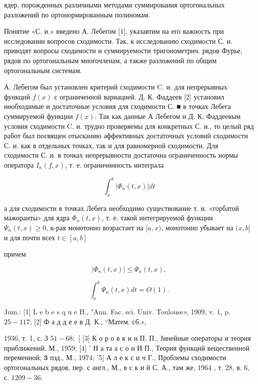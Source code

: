 \documentclass[10pt]{article}
\begin{document}
ядер, порожденных различными методами суммирования ортогональных разложений по ортонормированным полиномам.



Понятие «С. и.» введено А. Лебегом [1], указавтим на его важность при исследовании вопросов сходимости. Так, к исследованию сходимости С. и. приводят вопросы сходимости и суммируемости тригонометрич. рядов Фурье, рядов по ортогональным многочленам, а также разложений по общим ортогональным системам.



А. Лебегом был установлен критерий сходимости C. и. для непрерывных функций $f(x)$ с ограниченной вариацией. Д. К. Фаддеев [2] установил нөобходимые и достаточные условия для сходимости С. ■ в точках Лебега суммируемой функции $f(x)$. Так как данные А Лебегом и Д. К. Фаддеевым условия сходимости C. и. трудно проверяемы для конкретных С. и., то целый ряд работ был посвящен отысканию әффективных достаточных условий сходимости С. и. как в отдельных точках, так и для равномерной сходимости. Для сходимости С. и. в точках непрерывности достаточна ограниченность нормы оператора $I_{n}(f, x)$, т. е. ограничөнность интеграла



\[

\int_{a}^{b}\left|\Phi_{n}(t, x)\right| d t

\]



а для сходимости в точках Лебега необходимо существование т. н. «горбатой мажоранты» для ядра $\Phi_{n}(t, x)$, т. е. такой интегрируемой функции $\Psi_{n}(t, x) \geqslant 0$, к-рая монотонно возрастает на $[a, x)$, монотонно убывает на $(x, b]$ и для почти всех $t \in[a, b]$



причем



\[

\left|\Phi_{n}(t, x)\right| \leqslant \Psi_{n}(t, x),

\]



\[

\int_{a}^{b} \Psi_{n}(t, x) d t=O(1) .

\]



Jum.: [1] L e b e s q u e H., "Ann. Fac. sci. Univ. Toulouse», 1909, v. 1, p. $25-117$; [2] Ф а д д е е в Д. К., “Матем. сб.»,

1936, т. 1, с. З $51-68 ;$ [ [3] К о р о в к и н П. П., Јинейные операторы и теория приближений, М., 1959; [4] ' Н а та а с о н И П., Теория функций вещественной переменной, $\mathbf{3}$ пзд., М., 1974; '5] А л е к с и ч Г., Проблемы сходимости ортогональных рядов, пер. с англ., М., в с к и й С. А., там же, 1964 , т. 28, в. 6, с. $1209-36$.
\end{document}

